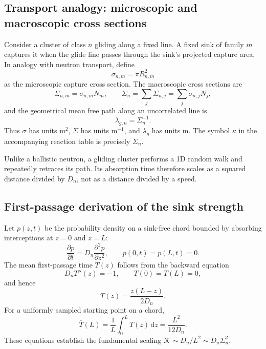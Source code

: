 \documentclass[11pt]{article}
\newcommand{\KK}{\mathcal{K}}
\newcommand{\dd}{\mathrm{d}}
\begin{document}
\subsection{Transport analogy: microscopic and macroscopic cross sections}
Consider a cluster of class \(n\) gliding along a fixed line. A fixed sink of
family \(m\) captures it when the glide line passes through the sink's
projected capture area. In analogy with neutron transport, define
\begin{equation}
 \sigma_{n,m}=\pi R_{n,m}^2                         \label{eq:sigma}
\end{equation}
as the microscopic capture cross section. The macroscopic cross sections are
\begin{equation}
 \Sigma_{n,m}=\sigma_{n,m}N_m,\qquad
 \Sigma_n=\sum_j\Sigma_{n,j}=\sum_j\sigma_{n,j}N_j,
 \label{eq:Sigma}
\end{equation}
and the geometrical mean free path along an uncorrelated line is
\begin{equation}
 \lambda_{g,n}=\Sigma_n^{-1}.                       \label{eq:mfp}
\end{equation}
Thus \(\sigma\) has units m\(^{2}\), \(\Sigma\) has units m\(^{-1}\), and
\(\lambda_g\) has units m. The symbol \(\kappa\) in the accompanying reaction
table is precisely \(\Sigma_n\).

Unlike a ballistic neutron, a gliding cluster performs a 1D random walk and
repeatedly retraces its path. Its absorption time therefore scales as a
squared distance divided by \(D_n\), not as a distance divided by a speed.

\subsection{First-passage derivation of the sink strength}
Let \(p(z,t)\) be the probability density on a sink-free chord bounded by
absorbing interceptions at \(z=0\) and \(z=L\):
\begin{equation}
 \frac{\partial p}{\partial t}=D_n\frac{\partial^2p}{\partial z^2},
 \qquad p(0,t)=p(L,t)=0.                            \label{eq:1d-fp}
\end{equation}
The mean first-passage time \(T(z)\) follows from the backward equation
\begin{equation}
 D_nT''(z)=-1,\qquad T(0)=T(L)=0,
\end{equation}
and hence
\begin{equation}
 T(z)=\frac{z(L-z)}{2D_n}.                          \label{eq:mfpt-position}
\end{equation}
For a uniformly sampled starting point on a chord,
\begin{equation}
 \overline T(L)=\frac1L\int_0^LT(z)\,\dd z
 =\frac{L^2}{12D_n}.                               \label{eq:mfpt-chord}
\end{equation}
These equations establish the fundamental scaling
\(\KK\sim D_n/L^2\sim D_n\Sigma_n^2\).
\end{document}
